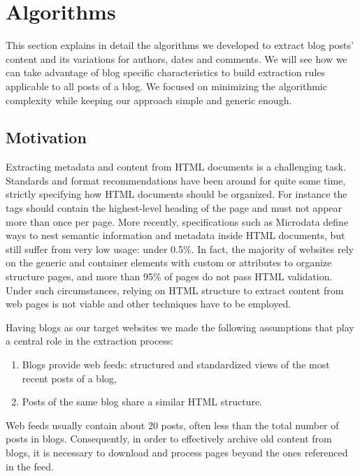 \section{Algorithms}\label{algorithms}

This section explains in detail the algorithms we developed to extract blog posts' content and its variations for authors, dates and comments. We will see how we can take advantage of blog specific characteristics to build extraction rules applicable to all posts of a blog. We focused on minimizing the algorithmic complexity while keeping our approach simple and generic enough.


\subsection{Motivation}
Extracting metadata and content from HTML documents is a challenging task. Standards and format recommendations have been around for quite some time, strictly specifying how HTML documents should be organized. For instance the  tags should contain the highest-level heading of the page and must not appear more than once per page\cite{w3c2002}. More recently, specifications such as Microdata\cite{whatwg2013} define ways to nest semantic information and metadata inside HTML documents, but still suffer from very low usage: under 0.5\%\cite{andrewrogers2013}. In fact, the majority of websites rely on the generic  and  container elements with custom  or  attributes to organize structure pages\cite{brianwilson2008}, and more than 95\% of pages do not pass HTML validation\cite{brianwilson2008-a}. Under such circumstances, relying on HTML structure to extract content from web pages is not viable and other techniques have to be employed.


Having blogs as our target websites we made the following assumptions that play a central role in the extraction process:
\begin{enumerate}[label={(\arabic*)}]
  \item\label{havefeedAssum} Blogs provide web feeds: structured and standardized views of the most recent posts of a blog,
  \item\label{similarhtmlAssum} Posts of the same blog share a similar HTML structure.
\end{enumerate}
Web feeds usually contain about 20 posts\cite{oita2010}, often less than the total number of posts in blogs. Consequently, in order to effectively archive old content from blogs, it is necessary to download and process pages beyond the ones referenced in the feed.

